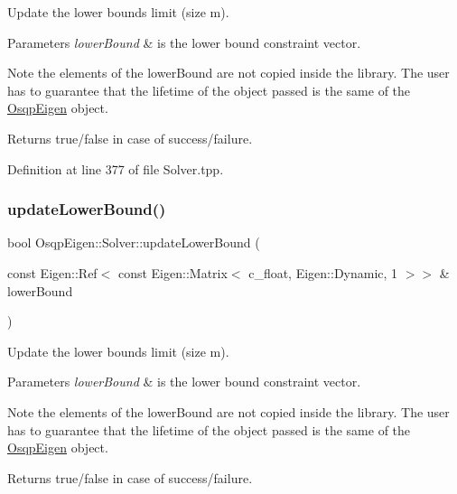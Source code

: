 Update the lower bounds limit (size m). 


\begin{DoxyParams}{Parameters}
{\em lower\+Bound} & is the lower bound constraint vector. \\
\hline
\end{DoxyParams}
\begin{DoxyNote}{Note}
the elements of the lower\+Bound are not copied inside the library. The user has to guarantee that the lifetime of the object passed is the same of the \mbox{\hyperlink{namespaceOsqpEigen}{Osqp\+Eigen}} object. 
\end{DoxyNote}
\begin{DoxyReturn}{Returns}
true/false in case of success/failure. 
\end{DoxyReturn}


Definition at line 377 of file Solver.\+tpp.

\mbox{\label{classOsqpEigen_1_1Solver_a443938e6942b79cbcbac7a5fe69a062e}} 
\subsubsection{\texorpdfstring{update\+Lower\+Bound()}{updateLowerBound()}\hspace{0.1cm}{\footnotesize\ttfamily [2/2]}}
{\footnotesize\ttfamily bool Osqp\+Eigen\+::\+Solver\+::update\+Lower\+Bound (\begin{DoxyParamCaption}\item[{const Eigen\+::\+Ref$<$ const Eigen\+::\+Matrix$<$ c\+\_\+float, Eigen\+::\+Dynamic, 1 $>$$>$ \&}]{lower\+Bound }\end{DoxyParamCaption})}



Update the lower bounds limit (size m). 


\begin{DoxyParams}{Parameters}
{\em lower\+Bound} & is the lower bound constraint vector. \\
\hline
\end{DoxyParams}
\begin{DoxyNote}{Note}
the elements of the lower\+Bound are not copied inside the library. The user has to guarantee that the lifetime of the object passed is the same of the \mbox{\hyperlink{namespaceOsqpEigen}{Osqp\+Eigen}} object. 
\end{DoxyNote}
\begin{DoxyReturn}{Returns}
true/false in case of success/failure. 
\end{DoxyReturn}


